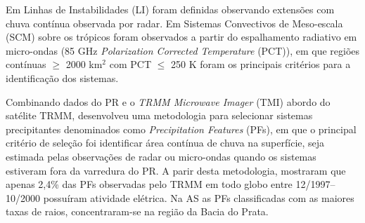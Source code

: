 


Em  Linhas de Instabilidades (LI) foram definidas observando extensões com chuva contínua observada por radar. Em  Sistemas Convectivos de Meso-escala (SCM) sobre os trópicos foram observados a partir do espalhamento radiativo em micro-ondas (85 GHz  \textit{Polarization Corrected Temperature} (PCT)), em que regiões contínuas $\geqslant$ 2000 km$^2$ com PCT $\leqslant$ 250 K foram os principais critérios para a identificação dos sistemas.


Combinando dados do PR e o \textit{TRMM Microwave Imager} (TMI) abordo do satélite TRMM,  desenvolveu uma metodologia para selecionar sistemas precipitantes denominados como \textit{Precipitation Features} (PFs), em que o principal critério de seleção foi identificar área contínua de chuva na superfície, seja estimada pelas observações de radar ou micro-ondas quando os sistemas estiveram fora da varredura do PR. A parir desta metodologia,  mostraram que apenas 2,4\% das PFs observadas pelo TRMM em todo globo entre 12/1997--10/2000 possuíram atividade elétrica. Na AS as PFs classificadas com as maiores taxas de raios, concentraram-se na região da Bacia do Prata.%


